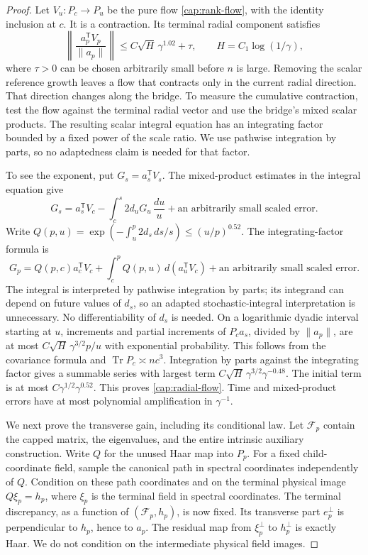 \begin{proof}
Let $V_u:P_c\longrightarrow P_u$ be the pure flow
\eqref{cap:rank-flow}, with the identity inclusion at $c$.
It is a contraction.  Its terminal radial component satisfies
\begin{equation}\label{cap:radial-flow}
 \left\|\frac{a_p^{\mathsf T}V_p}{\|a_p\|}\right\|
       \le C\sqrt H\,\gamma^{1.02}+\tau,
       \qquad H=C_1\log(1/\gamma),
\end{equation}
where $\tau>0$ can be chosen arbitrarily small before $n$ is large. Removing
the scalar reference growth leaves a flow that contracts only in the current
radial direction. That direction changes along the bridge. To measure the
cumulative contraction, test the flow against the terminal radial vector and
use the bridge's mixed scalar products. The resulting scalar integral equation
has an integrating factor bounded by a fixed power of the scale ratio. We use
pathwise integration by parts, so no adaptedness claim is needed for that
factor.

To see the exponent, put $G_s=a_s^{\mathsf T}V_s$.
The mixed-product estimates in the integral equation give
\[
 G_s=a_s^{\mathsf T}V_c-
       \int_c^s2d_uG_u\,\frac{du}{u}
       +\text{an arbitrarily small scaled error}.
\]
Write $Q(p,u)=\exp(-\int_u^p2d_s\,ds/s)\le(u/p)^{0.52}$.
The integrating-factor formula is
\[
 G_p=Q(p,c)a_c^{\mathsf T}V_c+
       \int_c^pQ(p,u)\,d(a_u^{\mathsf T}V_c)
       +\text{an arbitrarily small scaled error}.
\]
The integral is interpreted by pathwise integration by parts; its integrand
can depend on future values of $d_s$, so an adapted stochastic-integral
interpretation is unnecessary. No differentiability of $d_s$ is needed. On a
logarithmic dyadic interval starting at $u$, increments and partial increments
of $P_ca_s$, divided by $\|a_p\|$, are at most $C\sqrt H\,\gamma^{3/2}p/u$
with exponential probability. This follows from the covariance formula and
$\operatorname{Tr}P_c\asymp nc^3$. Integration by parts against the
integrating factor gives a summable series with largest term $C\sqrt
H\,\gamma^{3/2}\gamma^{-0.48}$. The initial term is at most
$C\gamma^{1/2}\gamma^{0.52}$. This proves \eqref{cap:radial-flow}. Time and
mixed-product errors have at most polynomial amplification in $\gamma^{-1}$.

We next prove the transverse gain, including its conditional law. Let
$\mathcal F_p$ contain the capped matrix, the eigenvalues, and the entire
intrinsic auxiliary construction. Write $Q$ for the unused Haar map into
$P_p$. For a fixed child-coordinate field, sample the canonical path in
spectral coordinates independently of $Q$. Condition on these path coordinates
and on the terminal physical image $Q\xi_p=h_p$, where $\xi_p$ is the terminal
field in spectral coordinates. The terminal discrepancy, as a function of
$(\mathcal F_p,h_p)$, is now fixed. Its transverse part $e_p^\perp$ is
perpendicular to $h_p$, hence to $a_p$. The residual map from $\xi_p^\perp$ to
$h_p^\perp$ is exactly Haar. We do not condition on the intermediate physical
field images.


\end{proof}
